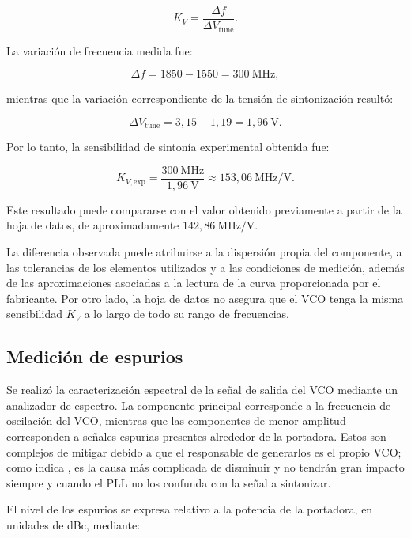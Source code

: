 \begin{equation}
K_V = \frac{\Delta f}{\Delta V_{\text{tune}}}.
\end{equation}

La variación de frecuencia medida fue:

\begin{equation}
\Delta f = 1850 - 1550 = 300~\mathrm{MHz},
\end{equation}

mientras que la variación correspondiente de la tensión de sintonización resultó:

\begin{equation}
\Delta V_{\text{tune}} = 3{,}15 - 1{,}19 = 1{,}96~\mathrm{V}.
\end{equation}

Por lo tanto, la sensibilidad de sintonía experimental obtenida fue:

\begin{equation}
K_{V,\mathrm{exp}} = \frac{300~\mathrm{MHz}}{1{,}96~\mathrm{V}} \approx 153{,}06~\mathrm{MHz/V}.
\end{equation}

Este resultado puede compararse con el valor obtenido previamente a partir de la hoja de datos, de aproximadamente $142{,}86~\mathrm{MHz/V}$.

La diferencia observada puede atribuirse a la dispersión propia del componente, a las tolerancias de los elementos utilizados y a las condiciones de medición, además de las aproximaciones asociadas a la lectura de la curva proporcionada por el fabricante. Por otro lado, la hoja de datos no asegura que el VCO tenga la misma sensibilidad $K_V$ a lo largo de todo su rango de frecuencias.

\subsection{Medición de espurios}
Se realizó la caracterización espectral de la señal de salida del VCO mediante un analizador de espectro. La componente principal corresponde a la frecuencia de oscilación del VCO, mientras que las componentes de menor amplitud corresponden a señales espurias presentes alrededor de la portadora. Estos son complejos de mitigar debido a que el responsable de generarlos es el propio VCO; como indica \cite{Dean Banerjee}, es la causa más complicada de disminuir y no tendrán gran impacto siempre y cuando el PLL no los confunda con la señal a sintonizar.

El nivel de los espurios se expresa relativo a la potencia de la portadora, en unidades de dBc, mediante:

